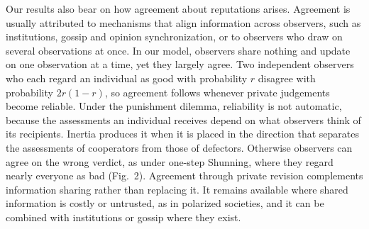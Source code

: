 Our results also bear on how agreement about reputations arises. Agreement is usually attributed to mechanisms that align information across observers, such as institutions, gossip and opinion synchronization\cite{radzvilavicius2021,kawakatsu2024,murase2024synchronization}, or to observers who draw on several observations at once\cite{michelmata2024}. In our model, observers share nothing and update on one observation at a time, yet they largely agree. Two independent observers who each regard an individual as good with probability $r$ disagree with probability $2r(1-r)$, so agreement follows whenever private judgements become reliable. Under the punishment dilemma, reliability is not automatic, because the assessments an individual receives depend on what observers think of its recipients. Inertia produces it when it is placed in the direction that separates the assessments of cooperators from those of defectors. Otherwise observers can agree on the wrong verdict, as under one-step Shunning, where they regard nearly everyone as bad (Fig.~2). Agreement through private revision complements information sharing rather than replacing it. It remains available where shared information is costly or untrusted, as in polarized societies\cite{iyengar2019,michelmata2024}, and it can be combined with institutions or gossip where they exist.
